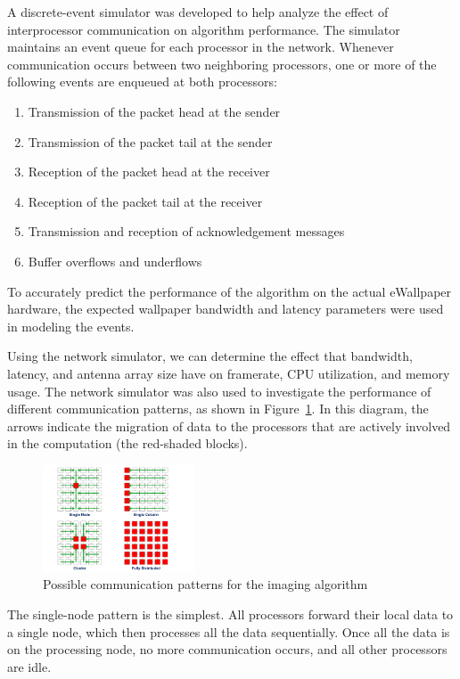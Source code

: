 \documentclass[twocolumn]{article}
\begin{document}
A discrete-event simulator was developed to help analyze the effect of interprocessor communication on algorithm performance. The simulator maintains an event queue for each processor in the network. Whenever communication occurs between two neighboring processors, one or more of the following events are enqueued at both processors:
\begin{enumerate}
\item Transmission of the packet head at the sender
\item Transmission of the packet tail at the sender
\item Reception of the packet head at the receiver
\item Reception of the packet tail at the receiver
\item Transmission and reception of acknowledgement messages
\item Buffer overflows and underflows
\end{enumerate}
To accurately predict the performance of the algorithm on the actual eWallpaper hardware, the expected wallpaper bandwidth and latency parameters were used in modeling the events. 

Using the network simulator, we can determine the effect that bandwidth, latency, and antenna array size have on framerate, CPU utilization, and memory usage. The network simulator was also used to investigate the performance of different communication patterns, as shown in Figure~\ref{comm_patterns_arrows}. In this diagram, the arrows indicate the migration of data to the processors that are actively involved in the computation (the red-shaded blocks).

\begin{figure}[!h]
\centering
\includegraphics*[width=0.4\textwidth, viewport=80 10 700 590]{figures/comm_patterns_arrows.pdf}
\caption{Possible communication patterns for the imaging algorithm}
\label{comm_patterns_arrows}
\end{figure}

The single-node pattern is the simplest. All processors forward their local data to a single node, which then processes all the data sequentially. Once all the data is on the processing node, no more communication occurs, and all other processors are idle. 
\end{document}
